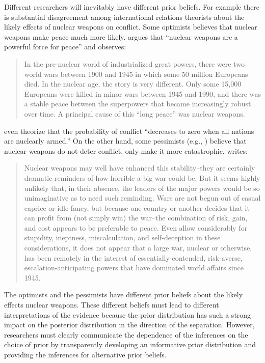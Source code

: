 \documentclass[12pt]{article}
\begin{document}
Different researchers will inevitably have different prior beliefs. For example there is substantial disagreement among international relations theorists about the likely effects of nuclear weapons on conflict. Some optimists believes that nuclear weapons make peace much more likely. \citet[p. 57]{Mearsheimer1993} argues that ``nuclear weapons are a powerful force for peace'' and observes:
\begin{quote}
In the pre-nuclear world of industrialized great powers, there were two world wars between 1900 and 1945 in which some 50 million Europeans died. In the nuclear age, the story is very different. Only some 15,000 Europeans were killed in minor wars between 1945 and 1990, and there was a stable peace between the superpowers that became increasingly robust over time. A principal cause of this ``long peace'' was nuclear weapons.
\end{quote}
\citet[p. 283]{BDMRiker1982} even theorize that the probability of conflict ``decreases to zero when all nations are nuclearly armed.'' On the other hand, some pessimists (e.g., \citealt{Sagan1994}) believe that nuclear weapons do not deter conflict, only make it more catastrophic. \citet[pp. 68-69]{Mueller1988} writes: 
\begin{quote}
Nuclear weapons may well have enhanced this stability--they are certainly dramatic reminders of how horrible a big war could be. But it seems highly unlikely that, in their absence, the leaders of the major powers would be so unimaginative as to need such reminding. Wars are not begun out of casual caprice or idle fancy, but because one country or another decides that it can profit from (not simply win) the war--the combination of risk, gain, and cost appears to be preferable to peace. Even allow considerably for stupidity, ineptness, miscalculation, and self-deception in these considerations, it does not appear that a large war, nuclear or otherwise, has been remotely in the interest of essentially-contended, risk-averse, escalation-anticipating powers that have dominated world affairs since 1945.
\end{quote}

The optimists and the pessimists have different prior beliefs about the likely effects nuclear weapons. These different beliefs must lead to different interpretations of the evidence because the prior distribution has such a strong impact on the posterior distribution in the direction of the separation. However, researchers must clearly communicate the dependence of the inferences on the choice of prior by transparently developing an informative prior distribution and providing the inferences for alternative prior beliefs.
\end{document}
